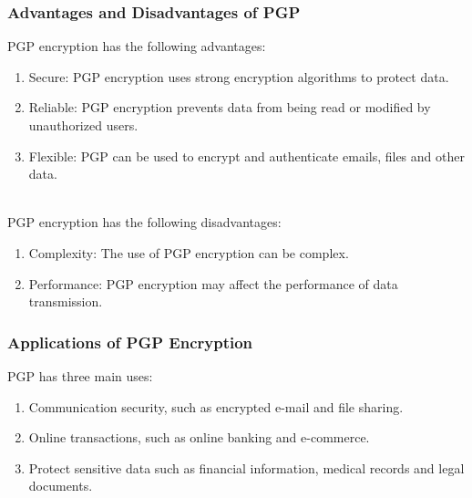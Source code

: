 \subsubsection{Advantages and Disadvantages of PGP}
PGP encryption has the following advantages:\cite{b9}
\begin{enumerate}[]
    \item Secure: PGP encryption uses strong encryption algorithms to protect data.
    \item Reliable: PGP encryption prevents data from being read or modified by unauthorized users.
    \item Flexible: PGP can be used to encrypt and authenticate emails, files and other data.
\end{enumerate}
\\
PGP encryption has the following disadvantages:\cite{b9}
\begin{enumerate}[]
    \item Complexity: The use of PGP encryption can be complex.
    \item Performance: PGP encryption may affect the performance of data transmission.
\end{enumerate}

\subsubsection{Applications of PGP Encryption}
PGP has three main uses\cite{b9}:
\begin{enumerate}[]
    \item Communication security, such as encrypted e-mail and file sharing.
    \item Online transactions, such as online banking and e-commerce.
    \item Protect sensitive data such as financial information, medical records and legal documents.
\end{enumerate}
    

